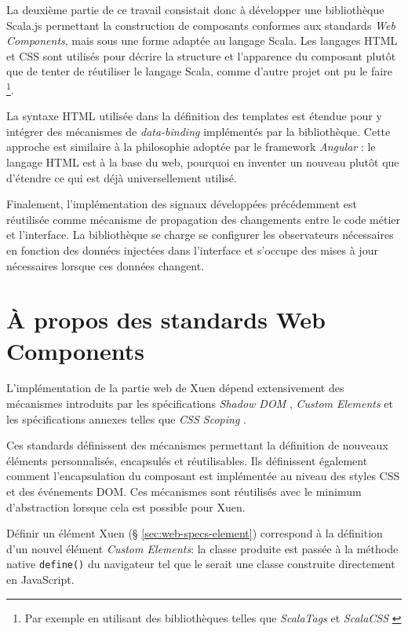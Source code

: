 La deuxième partie de ce travail consistait donc à développer une bibliothèque Scala.js permettant la construction de composants conformes aux standards \emph{Web Components}, mais sous une forme adaptée au langage Scala. Les langages HTML et CSS sont utilisés pour décrire la structure et l'apparence du composant plutôt que de tenter de réutiliser le langage Scala, comme d'autre projet ont pu le faire \footnote{Par exemple en utilisant des bibliothèques telles que \emph{ScalaTags} \cite{scalatags} et \emph{ScalaCSS} \cite{scalacss}}.

La syntaxe HTML utilisée dans la définition des templates est étendue pour y intégrer des mécanismes de \emph{data-binding} implémentés par la bibliothèque. Cette approche est similaire à la philosophie adoptée par le framework \emph{Angular} \cite{angular}: le langage HTML est à la base du web, pourquoi en inventer un nouveau plutôt que d'étendre ce qui est déjà universellement utilisé.

Finalement, l'implémentation des signaux développées précédemment est réutilisée comme mécanisme de propagation des changements entre le code métier et l'interface. La bibliothèque se charge se configurer les observateurs nécessaires en fonction des données injectées dans l'interface et s'occupe des mises à jour nécessaires lorsque ces données changent.

\section{À propos des standards Web Components} \label{sec:web-about-webcomponents}

L'implémentation de la partie web de Xuen dépend extensivement des mécanismes introduits par les spécifications \emph{Shadow DOM} \cite{w3c-shadowdom}, \emph{Custom Elements} \cite{w3c-custom-elements} et les spécifications annexes telles que \emph{CSS Scoping} \cite{w3c-css-scopings}.

Ces standards définissent des mécanismes permettant la définition de nouveaux éléments personnalisés, encapsulés et réutilisables. Ils définissent également comment l'encapsulation du composant est implémentée au niveau des styles CSS et des événements DOM. Ces mécanismes sont réutilisés avec le minimum d'abstraction lorsque cela est possible pour Xuen.

Définir un élément Xuen (§ \ref{sec:web-specs-element}) correspond à la définition d'un nouvel élément \emph{Custom Elements}: la classe produite est passée à la méthode native \texttt{define()} du navigateur tel que le serait une classe construite directement en JavaScript.

